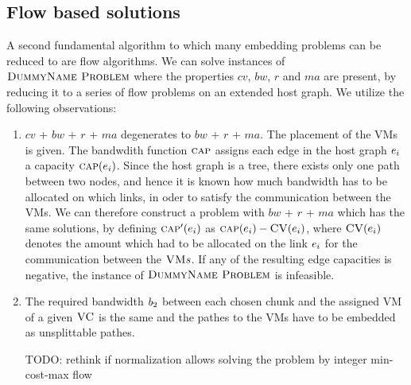 \subsection{Flow based solutions}

A second fundamental algorithm to which many embedding problems can be reduced 
to are flow algorithms. We can solve instances of $\textsc{DummyName Problem}$ where the 
properties $cv$, $bw$, $r$ and $ma$ are present, by reducing it to a series of 
flow problems on an extended host graph. We utilize the following observations:

\newcommand{\Source}{\ensuremath{s}}
\newcommand{\Sink}{\ensuremath{t}}

\begin{enumerate}
\item $cv$ + $bw$ + $r$ + $ma$ degenerates to  $bw$ + $r$ + $ma$. 
The placement of the VMs is given. The bandwdith function $\textsc{cap}$ assigns 
each edge in the host graph $e_i$ a capacity 
$\textsc{cap}(e_i)$. Since the 
host graph is a tree, there exists only one path between two nodes, and hence 
it is known how much bandwidth has to be allocated on which links, in oder to 
satisfy the communication between the VMs. We can therefore construct a 
problem with $bw$ + $r$ + $ma$ which has the same solutions, by defining 
$\textsc{cap}'(e_i)$ as 
$\textsc{cap}(e_i) - \textsc{CV}(e_i)$, where 
$\textsc{CV}(e_i)$ denotes the amount which 
had to be allocated on the link $e_i$ for the communication 
between the $\textsc{VM} s$. If any of the resulting edge capacities is negative, the 
instance of $\textsc{DummyName Problem}$ is infeasible.
\item The required bandwidth $b_2$ between each chosen chunk and the 
assigned VM of a given $\textsc{VC}$ is 
the same and the pathes to the VMs have to be embedded as unsplittable 
pathes.

TODO: rethink if normalization allows solving the problem by integer min-cost-max flow


\end{enumerate}
